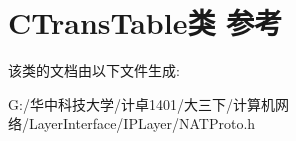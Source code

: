 \hypertarget{class_c_trans_table}{}\section{C\+Trans\+Table类 参考}
\label{class_c_trans_table}


该类的文档由以下文件生成\+:\begin{DoxyCompactItemize}
\item 
G\+:/华中科技大学/计卓1401/大三下/计算机网络/\+Layer\+Interface/\+I\+P\+Layer/N\+A\+T\+Proto.\+h\end{DoxyCompactItemize}
